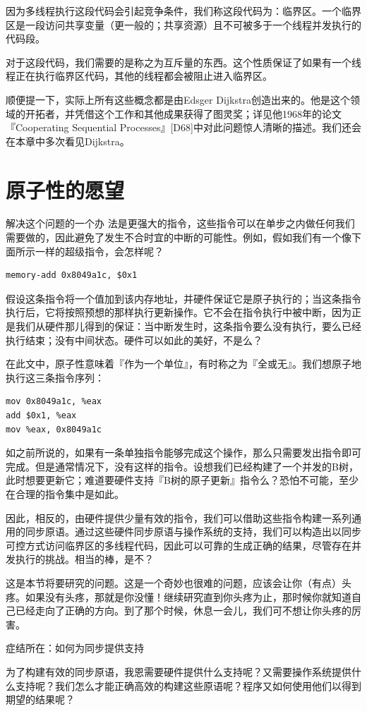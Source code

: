 因为多线程执行这段代码会引起竞争条件，我们称这段代码为：临界区。一个临界区是一段访问共享变量（更一般的；共享资源）且不可被多于一个线程并发执行的代码段。

对于这段代码，我们需要的是称之为互斥量的东西。这个性质保证了如果有一个线程正在执行临界区代码，其他的线程都会被阻止进入临界区。

顺便提一下，实际上所有这些概念都是由Edsger Dijkstra创造出来的。他是这个领域的开拓者，并凭借这个工作和其他成果获得了图灵奖；详见他1968年的论文『Cooperating Sequential Processes』[D68]中对此问题惊人清晰的描述。我们还会在本章中多次看见Dijkstra。

\section{原子性的愿望}
解决这个问题的一个办
法是更强大的指令，这些指令可以在单步之内做任何我们需要做的，因此避免了发生不合时宜的中断的可能性。例如，假如我们有一个像下面所示一样的超级指令，会怎样呢？
\begin{verbatim}
memory-add 0x8049a1c, $0x1
\end{verbatim}

假设这条指令将一个值加到该内存地址，并硬件保证它是原子执行的；当这条指令执行后，它将按照预想的那样执行更新操作。它不会在指令执行中被中断，因为正是我们从硬件那儿得到的保证：当中断发生时，这条指令要么没有执行，要么已经执行结束；没有中间状态。硬件可以如此的美好，不是么？

在此文中，原子性意味着『作为一个单位』，有时称之为『全或无』。我们想原子地执行这三条指令序列：
\begin{verbatim}
mov 0x8049a1c, %eax
add $0x1, %eax
mov %eax, 0x8049a1c
\end{verbatim}

如之前所说的，如果有一条单独指令能够完成这个操作，那么只需要发出指令即可完成。但是通常情况下，没有这样的指令。设想我们已经构建了一个并发的B树，此时想要更新它；难道要硬件支持『B树的原子更新』指令么？恐怕不可能，至少在合理的指令集中是如此。

因此，相反的，由硬件提供少量有效的指令，我们可以借助这些指令构建一系列通用的同步原语。通过这些硬件同步原语与操作系统的支持，我们可以构造出以同步可控方式访问临界区的多线程代码，因此可以可靠的生成正确的结果，尽管存在并发执行的挑战。相当的棒，是不？

这是本节将要研究的问题。这是一个奇妙也很难的问题，应该会让你（有点）头疼。如果没有头疼，那就是你没懂！继续研究直到你头疼为止，那时候你就知道自己已经走向了正确的方向。到了那个时候，休息一会儿，我们可不想让你头疼的厉害。
\begin{tcolorbox}[colframe=grey,colback= grey,arc=0pt,left=6pt,right=6pt,top=6pt,bottom=6pt,boxsep=0pt]
\begin{center}症结所在：如何为同步提供支持\end{center}

为了构建有效的同步原语，我恩需要硬件提供什么支持呢？又需要操作系统提供什么支持呢？我们怎么才能正确高效的构建这些原语呢？程序又如何使用他们以得到期望的结果呢？
\end{tcolorbox}

